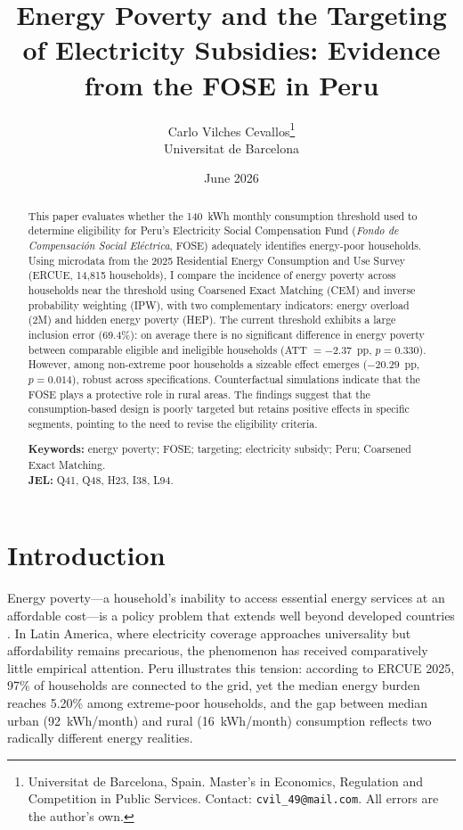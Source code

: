 \documentclass[11pt,a4paper]{article}
\title{\vspace{-1.2cm}\bfseries Energy Poverty and the Targeting of Electricity
Subsidies: Evidence from the FOSE in Peru}
\author{Carlo Vilches Cevallos\thanks{Universitat de Barcelona, Spain.
Master's in Economics, Regulation and Competition in Public Services.
Contact: \texttt{cvil\_49@mail.com}. All errors are the author's own.}\\[2pt]
\small Universitat de Barcelona}
\date{June 2026}
\begin{document}
\maketitle

\begin{abstract}
\noindent This paper evaluates whether the 140~kWh monthly consumption
threshold used to determine eligibility for Peru's Electricity Social
Compensation Fund (\textit{Fondo de Compensaci\'on Social El\'ectrica}, FOSE)
adequately identifies energy-poor households. Using microdata from the 2025
Residential Energy Consumption and Use Survey (ERCUE, 14{,}815 households), I
compare the incidence of energy poverty across households near the threshold
using Coarsened Exact Matching (CEM) and inverse probability weighting (IPW),
with two complementary indicators: energy overload (2M) and hidden energy
poverty (HEP). The current threshold exhibits a large inclusion error
(69.4\%): on average there is no significant difference in energy poverty
between comparable eligible and ineligible households (ATT $=-2.37$~pp,
$p=0.330$). However, among non-extreme poor households a sizeable effect
emerges ($-20.29$~pp, $p=0.014$), robust across specifications.
Counterfactual simulations indicate that the FOSE plays a protective role in
rural areas. The findings suggest that the consumption-based design is poorly
targeted but retains positive effects in specific segments, pointing to the
need to revise the eligibility criteria.

\medskip
\noindent\textbf{Keywords:} energy poverty; FOSE; targeting; electricity
subsidy; Peru; Coarsened Exact Matching.\\
\textbf{JEL:} Q41, Q48, H23, I38, L94.
\end{abstract}

\section{Introduction}

Energy poverty---a household's inability to access essential energy services
at an affordable cost---is a policy problem that extends well beyond developed
countries \citep{epov2023}. In Latin America, where electricity coverage
approaches universality but affordability remains precarious, the phenomenon
has received comparatively little empirical attention. Peru illustrates this
tension: according to ERCUE 2025, 97\% of households are connected to the
grid, yet the median energy burden reaches 5.20\% among extreme-poor
households, and the gap between median urban (92~kWh/month) and rural
(16~kWh/month) consumption reflects two radically different energy realities.
\end{document}
